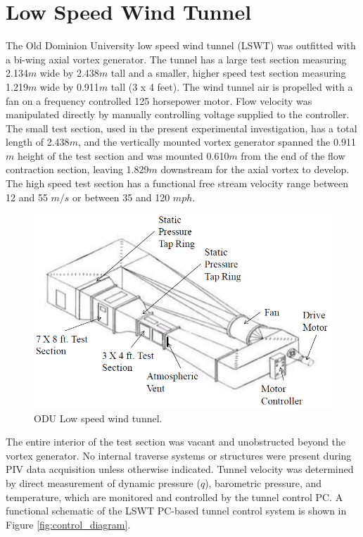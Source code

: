 
\section{Low Speed Wind Tunnel}

The Old Dominion University low 
speed wind tunnel (LSWT) was outfitted with a bi-wing axial vortex generator. 
The tunnel has a large test section measuring 2.134$m$ wide by 2.438$m$ 
tall and a smaller, higher speed test section measuring 1.219$m$ wide by 
0.911$m$ tall (3 x 4 feet). The 
wind tunnel air is propelled with a fan on a frequency controlled 125 
horsepower motor. 
Flow velocity was manipulated directly by manually controlling
voltage supplied to the controller. 
The small test section, used in the present experimental investigation, has a 
total length of 2.438$m$, and the vertically mounted vortex generator 
spanned the 0.911$m$ height of the test section and was 
mounted 0.610$m$ from the end of the flow contraction section, leaving 1.829$m$ 
downstream for the axial 
vortex to develop. The high speed test section has a functional free stream 
velocity range between 12 and 55  $m/s$ or between 35 and 120 $mph$.

\begin{figure}[H]
\centering
\includegraphics[width=5in]{figs/setup/odulswt_diagram}
\caption{ODU Low speed wind tunnel.}
\label{fig:odulswt}
\end{figure}

The entire interior of the test section was vacant and unobstructed beyond the 
vortex generator. 
No internal traverse systems or structures 
were present during PIV data acquisition unless otherwise indicated. Tunnel 
velocity was determined by direct measurement of dynamic pressure ($q$), 
barometric pressure, and temperature, which 
are monitored and controlled by the tunnel control PC. A functional schematic 
of the LSWT PC-based tunnel control system is shown in Figure 
\ref{fig:control_diagram}.

